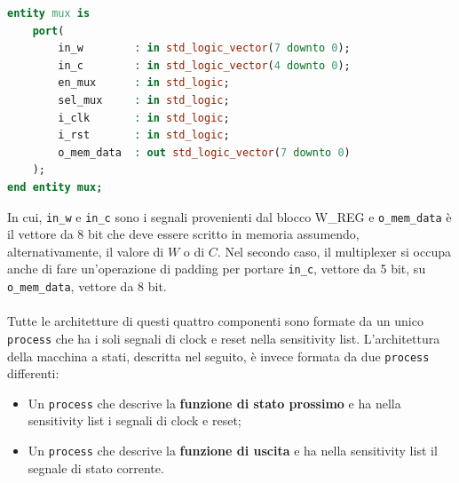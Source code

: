 \documentclass[10pt]{article}
\begin{document}
	\begin{lstlisting}[language=vhdl]
entity mux is
	port(
		in_w        : in std_logic_vector(7 downto 0);
		in_c        : in std_logic_vector(4 downto 0);
		en_mux      : in std_logic;
		sel_mux     : in std_logic;
		i_clk       : in std_logic;
		i_rst       : in std_logic;
		o_mem_data  : out std_logic_vector(7 downto 0)
	);
end entity mux;
\end{lstlisting}
	In cui, \lstinline[style=vhdl]|in_w| e \lstinline[style=vhdl]|in_c| sono i segnali provenienti dal blocco W\_REG e \lstinline[style=vhdl]|o_mem_data| è il vettore da 8 bit che deve essere scritto in memoria assumendo, alternativamente, il valore di $W$ o di $C$. Nel secondo caso, il multiplexer si occupa anche di fare un'operazione di padding per portare \lstinline[style=vhdl]|in_c|, vettore da 5 bit, su \lstinline[style=vhdl]|o_mem_data|, vettore da 8 bit.
	\paragraph{}
	Tutte le architetture di questi quattro componenti sono formate da un unico \lstinline[style=vhdl]|process| che ha i soli segnali di clock e reset nella sensitivity list. L'architettura della macchina a stati, descritta nel seguito, è invece formata da due \lstinline[style=vhdl]|process| differenti:
	\begin{itemize}
		\item Un \lstinline[style=vhdl]|process| che descrive la \textbf{funzione di stato prossimo} e ha nella sensitivity list i segnali di clock e reset;
		\item Un \lstinline[style=vhdl]|process| che descrive la \textbf{funzione di uscita} e ha nella sensitivity list il segnale di stato corrente.
	\end{itemize}
\end{document}
